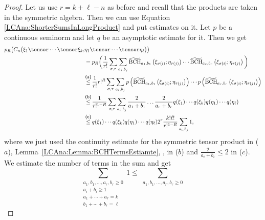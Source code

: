\begin{proof}
    Let us use $r = k + \ell - n$ as before and recall that the
    products are taken in the symmetric algebra. Then we can use
    Equation \eqref{LCAna:ShorterSumsInLongProduct} and put estimates on it.  
    Let $p$ be a continuous seminorm and let $q$ be an asymptotic estimate
    for it. Then we get
    \begin{align*}
        p_R \big(
            C_n \big(
                \xi_1 \tensor \cdots \tensor \xi_k, &
                \eta_1 \tensor \cdots \tensor \eta_{\ell}
            \big)
        \big)
        \\
        &=
        p_R \bigg(
         	\frac{1}{r!}
			\sum\limits_{\sigma, \tau}
			\sum\limits_{a_i, b_j}
			\bchtilde{a_1}{b_1}{\xi_{\sigma(i)}}{\eta_{\tau(j)}}
			\cdots
			\bchtilde{a_r}{b_r}{\xi_{\sigma(i)}}{\eta_{\tau(j)}}
        \bigg)
        \\
        & \ot{(a)}{\leq}
        \frac{1}{r!}
        r!^R
        \sum\limits_{\sigma, \tau}
		\sum\limits_{a_i, b_j}
        p \left(
            \bchtilde{a_1}{b_1}{\xi_{\sigma(i)}}{\eta_{\tau(j)}}
        \right)
        \cdots
        p \left(
            \bchtilde{a_r}{b_r}{\xi_{\sigma(i)}}{\eta_{\tau(j)}}
        \right)
        \\
        & \ot{(b)}{\leq}
        \frac{1}{r!^{1-R}}
        \sum\limits_{\sigma, \tau}
		\sum\limits_{a_i, b_j}
		\frac{2}{a_1 + b_1}
		\ldots
		\frac{2}{a_r + b_r}
		q(\xi_1) \cdots q(\xi_k)
		q(\eta_1) \cdots q(\eta_{\ell})
        \\
        & \ot{(c)}{\leq}
		q(\xi_1) \cdots q(\xi_k)
		q(\eta_1) \cdots q(\eta_{\ell})
        2^r
        \frac{k! \ell!}{r!^{1-R}}
        \sum\limits_{a_i, b_j}
		1,
    \end{align*}
    where we just used the continuity estimate for the symmetric
    tensor product in ($a$), Lemma~\ref{LCAna:Lemma:BCHTermsEstiamte},
    , in ($b$) and $\frac{2}{a_i + b_i} \leq
    2$ in ($c$). We estimate the number of terms in the sum and get
    \begin{equation*}
        \sum\limits_{\substack{a_1, b_1, \ldots, a_r, b_r \geq 0 \\
            a_i + b_i \geq 1 \\
            a_1 + \cdots + a_r = k \\
            b_1 + \cdots + b_r = \ell
          }}
		1
		\leq
        \sum\limits_{\substack{a_1, b_1, \ldots, a_r, b_r \geq 0 \\
}}
\end{equation*}
\end{proof}
